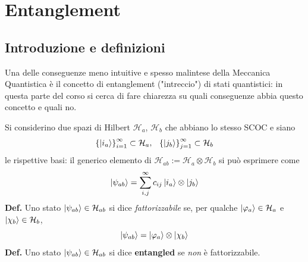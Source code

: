 \chapter{Entanglement}
\section{Introduzione e definizioni}
Una delle conseguenze meno intuitive e spesso malintese della Meccanica Quantistica è il concetto di
entanglement ("intreccio") di stati quantistici: in questa parte del corso si cerca di fare chiarezza
su quali conseguenze abbia questo concetto e quali no.

Si considerino due spazi di Hilbert $\mathcal{H}_a$, $\mathcal{H}_b$ che abbiano lo stesso SCOC e
siano
\begin{gather*}
    \left\{\ket{i_a}\right\}_{i=1}^\infty\subset\mathcal{H}_a,\phantom{x}
    \left\{\ket{j_b}\right\}_{j=1}^\infty\subset\mathcal{H}_b
\end{gather*}
le rispettive basi: il generico elemento di $\mathcal{H}_{ab}:=\mathcal{H}_a\otimes\mathcal{H}_b$
si può esprimere come
$$\ket{\psi_{ab}} = \sum_{i,j}^{\infty}c_{ij}\ket{i_a}\otimes\ket{j_b}$$
\textbf{Def.} Uno stato $\ket{\psi_{ab}}\in\mathcal{H}_{ab}$ si dice \textit{fattorizzabile} se,
per qualche $\ket{\varphi_a}\in\mathcal{H}_a$ e $\ket{\chi_b}\in\mathcal{H}_b$,
$$\ket{\psi_{ab}} = \ket{\varphi_a}\otimes\ket{\chi_b}$$
\textbf{Def.} Uno stato $\ket{\psi_{ab}}\in\mathcal{H}_{ab}$ si dice \textbf{entangled} se
\textit{non} è fattorizzabile.

